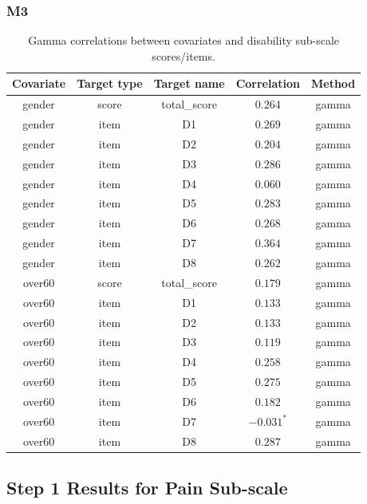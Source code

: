 \subsubsection{M3}
\begin{table}[H]
    \centering
    \begin{tabular}{c c c c c}
        \hline
        Covariate & Target type & Target name & Correlation & Method \\
        \hline
        gender & score & total\_score & $0.264$ & gamma \\
        gender & item & D1 & $0.269$ & gamma \\
        gender & item & D2 & $0.204$ & gamma \\
        gender & item & D3 & $0.286$ & gamma \\
        gender & item & D4 & $0.060$ & gamma \\
        gender & item & D5 & $0.283$ & gamma \\
        gender & item & D6 & $0.268$ & gamma \\
        gender & item & D7 & $0.364$ & gamma \\
        gender & item & D8 & $0.262$ & gamma \\
        over60 & score & total\_score & $0.179$ & gamma \\
        over60 & item & D1 & $0.133$ & gamma \\
        over60 & item & D2 & $0.133$ & gamma \\
        over60 & item & D3 & $0.119$ & gamma \\
        over60 & item & D4 & $0.258$ & gamma \\
        over60 & item & D5 & $0.275$ & gamma \\
        over60 & item & D6 & $0.182$ & gamma \\
        over60 & item & D7 & $\mathbf{-0.031^*}$ & gamma \\
        over60 & item & D8 & $0.287$ & gamma \\
        \hline
    \end{tabular}
    \caption{Gamma correlations between covariates and disability sub-scale scores/items.}
    \label{tab:gamma_covariates_disability}
\end{table}

\subsection{Step 1 Results for Pain Sub-scale}
